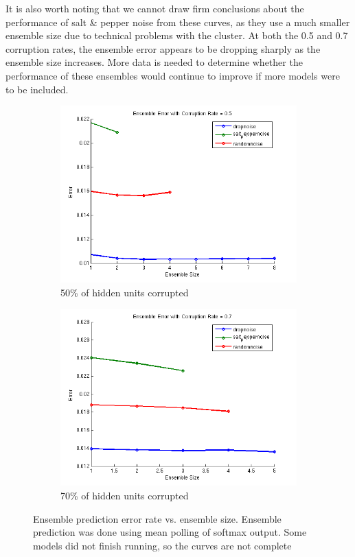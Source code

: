 \documentclass{article} %
\begin{document}
It is also worth noting that we cannot draw firm conclusions about the performance of salt \& pepper noise from these curves, as they use a much smaller ensemble size due to technical problems with the cluster. At both the 0.5 and 0.7 corruption rates, the ensemble error appears to be dropping sharply as the ensemble size increases. More data is needed to determine whether the performance of these ensembles would continue to improve if more models were to be included.

\begin{figure}
\centering
\begin{subfigure}{.5\textwidth}
  \centering
  \includegraphics[width=\textwidth]{ensemble05}
  \caption{50\% of hidden units corrupted}
  \label{fig:ect05}
\end{subfigure}%
\begin{subfigure}{.5\textwidth}
  \centering
  \includegraphics[width=\textwidth]{ensemble07}
  \caption{70\% of hidden units corrupted}
  \label{fig:ect07}
\end{subfigure}
\caption{Ensemble prediction error rate vs. ensemble size. Ensemble prediction was done using mean polling of softmax output. Some models did not finish running, so the curves are not complete}
\label{fig:ensemble_corruption_type}
\end{figure}
\end{document}
